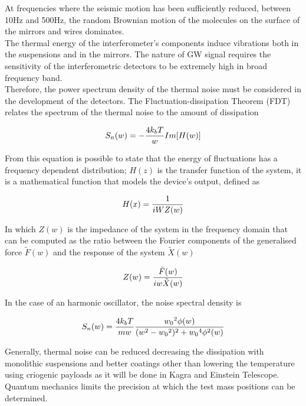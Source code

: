 \documentclass[binding=0.6cm, LaM]{sapthesis}
\begin{document}
        At frequencies where the seismic motion has been sufficiently reduced,
        between 10Hz and 500Hz, the random Brownian motion of the molecules on the surface of the mirrors and wires dominates. \\
    
        The thermal energy of the interferometer’s components induce vibrations both in the suspensions and in the mirrors.
        The nature of GW signal requires the sensitivity of the interferometric detectors
        to be extremely high in broad frequency band. \\
        Therefore, the power spectrum density of the thermal noise must be considered in the development of the detectors.
        The Fluctuation-dissipation Theorem (FDT) relates the spectrum of the thermal noise to the amount of dissipation

                \begin{equation}
                S_{n}(w) = - {{4k_bT} \over {w}} Im[H(w)]
                \end{equation}

        From this equation is possible to state that the energy of fluctuations has a frequency dependent distribution;
        $H(z)$ is the transfer function of the system, it is a mathematical function that models the device’s output, defined as

                \begin{equation}
                H(x) = {1 \over {iWZ(w)}}
                \end{equation}

        In which $Z(w)$ is the impedance of the system in the frequency domain that can be computed as the ratio
        between the Fourier components of the generalised force $\tilde F(w)$ and the response of the system $\tilde X(w)$

                \begin{equation}
                Z(w) = {{\tilde F(w)} \over {iw \tilde X(w)}}
                \end{equation}

        In the case of an harmonic oscillator, the noise spectral density is

                \begin{equation}
                S_n(w) = {{4k_bT} \over {mw}} {{{w_0}^2 \phi(w)} \over {(w^2-{w_0}^2)^2 + {w_0}^4 \phi^2(w)}}
		\end{equation} 

	Generally, thermal noise can be reduced decreasing the dissipation with monolithic suspensions and better coatings
        other than lowering the temperature using criogenic payloads as it will be done in Kagra and Einstein Telescope. \\
        Quantum mechanics limits the precision at which the test mass positions can be determined. 
\end{document}
